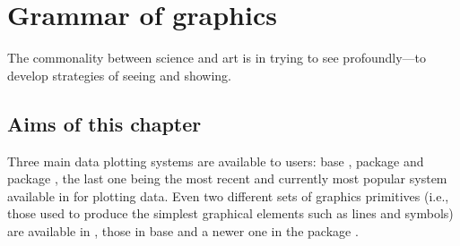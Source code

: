 \documentclass[krantz2]{krantz}\usepackage{knitr}
\begin{document}



\chapter{Grammar of graphics}\label{chap:R:plotting}

\begin{VF}
The commonality between science and art is in trying to see profoundly---to develop strategies of seeing and showing.

\nocite{Zachry2004}
\end{VF}



\section{Aims of this chapter}

Three main data plotting systems are available to \Rlang users: base \Rlang, package  \autocite{Sarkar2008} and package  \autocite{Wickham2016}, the last one being the most recent and currently most popular system available in \Rlang for plotting data. Even two different sets of graphics primitives (i.e., those used to produce the simplest graphical elements such as lines and symbols) are available in \Rlang, those in base \Rlang and a newer one in the  package \autocite{Murrell2011}.
\end{document}
